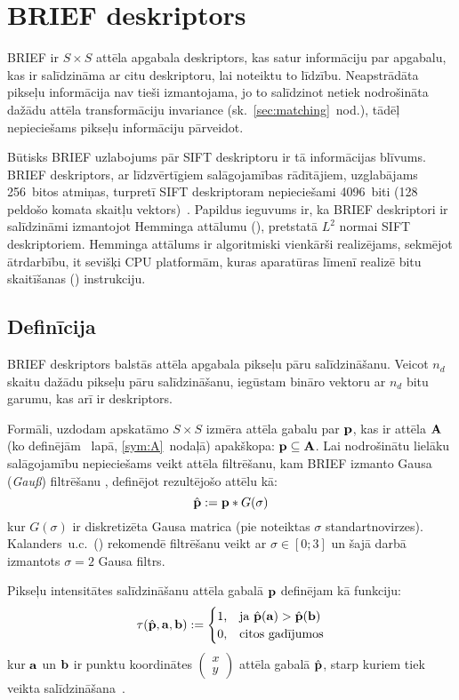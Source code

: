 \section{BRIEF deskriptors} \label{sec:brief}
BRIEF ir $S \times S$ attēla apgabala deskriptors, kas satur informāciju par
apgabalu, kas ir salīdzināma ar citu deskriptoru, lai noteiktu to līdzību.
Neapstrādāta pikseļu informācija nav tieši izmantojama, jo to salīdzinot
netiek nodrošināta dažādu attēla transformāciju invariance
(sk.~\ref{sec:matching}~nod.), tādēļ nepieciešams pikseļu informāciju
pārveidot.

Būtisks BRIEF uzlabojums pār SIFT deskriptoru ir tā informācijas blīvums.
BRIEF deskriptors, ar līdzvērtīgiem salāgojamības rādītājiem, uzglabājams
256~bitos atmiņas, turpretī SIFT deskriptoram nepieciešami 4096~biti
(128 peldošo komata skaitļu vektors)~\cite{BRIEF}. Papildus ieguvums ir,
ka BRIEF deskriptori ir salīdzināmi izmantojot Hemminga attālumu
(), pretstatā $L^2$ normai SIFT deskriptoriem.
Hemminga attālums ir algoritmiski vienkārši realizējams, sekmējot ātrdarbību,
it sevišķi CPU platformām, kuras aparatūras līmenī realizē
bitu skaitīšanas () instrukciju.

\subsection{Definīcija} \label{sec:brief-def}
BRIEF deskriptors balstās attēla apgabala pikseļu pāru salīdzināšanu.
Veicot $n_d$ skaitu dažādu pikseļu pāru salīdzināšanu, iegūstam
bināro vektoru ar $n_d$ bitu garumu, kas arī ir deskriptors.
\cite{BRIEF}\cite{ORB}

Formāli, uzdodam apskatāmo $S \times S$ izmēra attēla gabalu par
$\mathbf{p}$, kas ir attēla $\mathbf{A}$
(ko definējām \pageref{sym:A}~lapā, \ref{sym:A}~nodaļā) apakškopa:
$\mathbf{p} \subseteq \mathbf{A}$. Lai nodrošinātu lielāku salāgojamību nepieciešams
veikt attēla filtrēšanu, kam BRIEF izmanto Gausa (\textit{Gauß}) filtrēšanu
\cite{BRIEF}, definējot rezultējošo attēlu kā:
\[
	\hat{\mathbf{p}} := \mathbf{p} \ast G(\sigma)
\]
kur $G(\sigma)$ ir diskretizēta Gausa matrica
(pie noteiktas $\sigma$ standartnovirzes).\\
Kalanders~u.c.\cite{BRIEF}~()
rekomendē filtrēšanu veikt ar $\sigma \in [0; 3]$ un šajā darbā izmantots
$\sigma = 2$ Gausa filtrs.

Pikseļu intensitātes salīdzināšanu attēla gabalā $\mathbf{p}$ definējam kā funkciju:
\begin{equation}
	\tau (\hat{\mathbf{p}}, \mathbf{a}, \mathbf{b}) := 
		\begin{cases}
			1\text{,} & \text{ja } \hat{\mathbf{p}}(\mathbf{a}) > \hat{\mathbf{p}}(\mathbf{b}) \\
			0\text{,} & \text{citos gadījumos}
		\end{cases}
\end{equation}
kur $\mathbf{a}$ un $\mathbf{b}$ ir punktu koordinātes
$\left(\begin{smallmatrix}x\\y\end{smallmatrix}\right)$
attēla gabalā $\hat{\mathbf{p}}$, starp kuriem tiek
veikta salīdzināšana~\cite{BRIEF}. 

